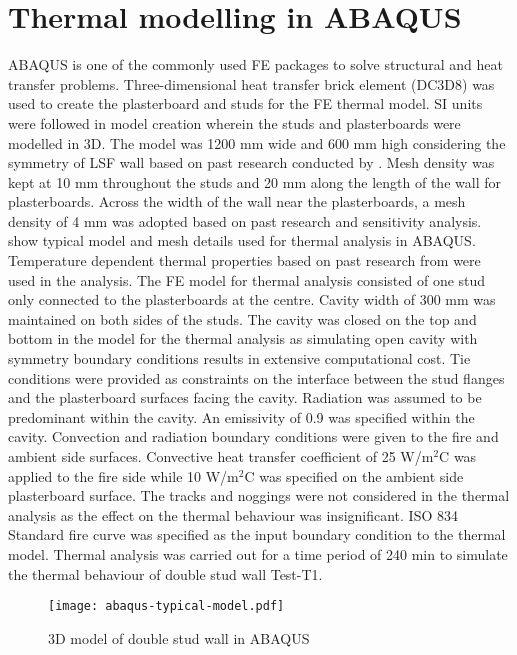 \section{Thermal modelling in ABAQUS}

ABAQUS is one of the commonly used FE packages to solve structural and heat transfer problems. Three-dimensional heat transfer brick element (DC3D8) was used to create the plasterboard and studs for the FE thermal model. SI units were followed in model creation wherein the studs and plasterboards were modelled in 3D. The model was 1200 mm wide and 600 mm high considering the symmetry of LSF wall based on past research conducted by \citet{Rusthi2017,Ariyanayagam2019}. Mesh density was kept at 10 mm throughout the studs and 20 mm along the length of the wall for plasterboards. Across the width of the wall near the plasterboards, a mesh density of 4 mm was adopted based on past research and sensitivity analysis.  show typical model and mesh details used for thermal analysis in ABAQUS. Temperature dependent thermal properties based on past research from \citet{Maneesha2018} were used in the analysis. The FE model for thermal analysis consisted of one stud only connected to the plasterboards at the centre. Cavity width of 300 mm was maintained on both sides of the studs. The cavity was closed on the top and bottom in the model for the thermal analysis as simulating open cavity with symmetry boundary conditions results in extensive computational cost. Tie conditions were provided as constraints on the interface between the stud flanges and the plasterboard surfaces facing the cavity. Radiation was assumed to be predominant within the cavity. An emissivity of 0.9 was specified within the cavity. Convection and radiation boundary conditions were given to the fire and ambient side surfaces. Convective heat transfer coefficient of 25 W/m$^2$\degree C was applied to the fire side while 10 W/m$^2$\degree C was specified on the ambient side plasterboard surface. The tracks and noggings were not considered in the thermal analysis as the effect on the thermal behaviour was insignificant. ISO 834 Standard fire curve was specified as the input boundary condition to the thermal model. Thermal analysis was carried out for a time period of 240 min to simulate the thermal behaviour of double stud wall Test-T1.
\begin{figure}[!htbp]
	\centering
		\texttt{[image: abaqus-typical-model.pdf]}
		\caption{3D model of double stud wall in ABAQUS}
		\label{fig:abaqus-typical-model-thermal}
\end{figure}
